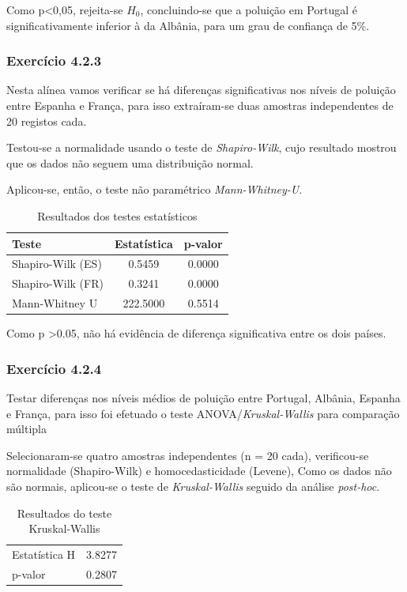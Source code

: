\documentclass[conference]{IEEEtran}
\begin{document}
Como p\textless0,05, rejeita-se $H_{0}$, concluindo-se que a poluição em Portugal é significativamente inferior à da Albânia, para um grau de confiança de 5\%.
\medskip
\subsubsection{\textbf{Exercício 4.2.3}}

Nesta alínea vamos verificar se há diferenças significativas nos níveis de poluição entre Espanha e França, para isso extraíram-se duas amostras independentes de 20 registos cada.

Testou-se a normalidade usando o teste de \textit{Shapiro-Wilk}, cujo resultado mostrou que os dados não seguem uma distribuição normal.

Aplicou-se, então, o teste não paramétrico \textit{Mann-Whitney-U}.

	\begin{table}[H]
		\centering
		\caption{Resultados dos testes estatísticos}
		\begin{tabular}{lcc}
			\toprule
			Teste & Estatística & p-valor \\
			\midrule
			Shapiro-Wilk (ES) & 0.5459 & 0.0000 \\
			Shapiro-Wilk (FR) & 0.3241 & 0.0000 \\
			Mann-Whitney U & 222.5000 & 0.5514 \\
			\bottomrule
		\end{tabular}
	\end{table}

Como p \textgreater 0.05, não há evidência de diferença significativa entre os dois países. 
\medskip
\subsubsection{\textbf{Exercício 4.2.4}}
	Testar diferenças nos níveis médios de poluição entre Portugal, Albânia, Espanha e França, para isso foi efetuado o teste ANOVA/\textit{Kruskal-Wallis} para comparação múltipla

Selecionaram-se quatro amostras independentes (n = 20 cada), verificou-se normalidade (Shapiro-Wilk) e homocedasticidade (Levene),
Como os dados não são normais, aplicou-se o teste de \textit{Kruskal-Wallis} seguido da análise \textit{post-hoc}.

	\begin{table}[H]
		\centering
		\caption{Resultados do teste Kruskal-Wallis}
		\begin{tabular}{lc}
			\toprule
			Estatística H & 3.8277 \\
			p-valor & 0.2807 \\
			\bottomrule
		\end{tabular}
	\end{table}
\end{document}
